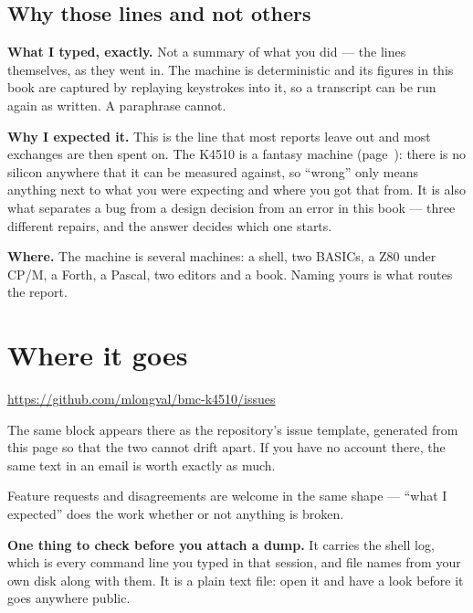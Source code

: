 \subsection*{Why those lines and not others}

\textbf{What I typed, exactly.} Not a summary of what you did --- the
lines themselves, as they went in. The machine is deterministic and its
figures in this book are captured by replaying keystrokes into it, so a
transcript can be run again as written. A paraphrase cannot.

\textbf{Why I expected it.} This is the line that most reports leave out
and most exchanges are then spent on. The K4510 is a fantasy machine
(page~\pageref{cha:disclaimer}): there is no silicon anywhere that it can
be measured against, so ``wrong'' only means anything next to what you
were expecting and where you got that from. It is also what separates a
bug from a design decision from an error in this book --- three different
repairs, and the answer decides which one starts.

\textbf{Where.} The machine is several machines: a shell, two BASICs, a
Z80 under CP/M, a Forth, a Pascal, two editors and a book. Naming yours
is what routes the report.

\section{Where it goes}
\begin{center}
\url{https://github.com/mlongval/bmc-k4510/issues}
\end{center}

\noindent The same block appears there as the repository's issue
template, generated from this page so that the two cannot drift apart. If
you have no account there, the same text in an email is worth exactly as
much.

Feature requests and disagreements are welcome in the same shape ---
``what I expected'' does the work whether or not anything is broken.

\begin{aside}
\textbf{One thing to check before you attach a dump.} It carries the
shell log, which is every command line you typed in that session, and
file names from your own disk along with them. It is a plain text file:
open it and have a look before it goes anywhere public.
\end{aside}
